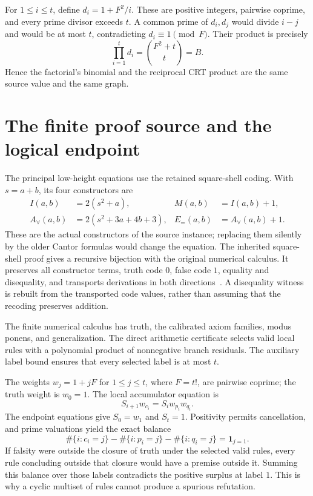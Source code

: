 \documentclass[11pt]{article}
\theoremstyle{remark}\newtheorem{remark}[theorem]{Remark}
\newcommand{\code}[1]{\texttt{\detokenize{#1}}}
\begin{document}
For $1\le i\le t$, define $d_i=1+F^2/i$. These are positive integers, pairwise coprime, and every prime divisor exceeds $t$. A common prime of $d_i,d_j$ would divide $i-j$ and would be at most $t$, contradicting $d_i\equiv1\pmod F$. Their product is precisely
\[
 \prod_{i=1}^t d_i=\binom{F^2+t}{t}=B.
\]
Hence the factorial's binomial and the reciprocal CRT product are the same source value and the same graph.

\section{The finite proof source and the logical endpoint}
\label{sec:logic}

The principal low-height equations use the retained \code{xx0} square-shell coding. With $s=a+b$, its four constructors are
\begin{align*}
 I(a,b)&=2(s^2+a),& M(a,b)&=I(a,b)+1,\\
 A_{\forall}(a,b)&=2(s^2+3a+4b+3),&E_{=}(a,b)&=A_{\forall}(a,b)+1.
\end{align*}
These are the actual constructors of the source instance; replacing them silently by the older Cantor formulas would change the equation. The inherited square-shell proof gives a recursive bijection with the original numerical calculus. It preserves all constructor terms, truth code $0$, false code $1$, equality and disequality, and transports derivations in both directions~\cite{shell}. A disequality witness is rebuilt from the transported code values, rather than assuming that the recoding preserves addition.

The finite numerical calculus has truth, the calibrated axiom families, modus ponens, and generalization. The direct arithmetic certificate selects valid local rules with a polynomial product of nonnegative branch residuals. The auxiliary label bound ensures that every selected label is at most $t$.

The weights $w_j=1+jF$ for $1\le j\le t$, where $F=t!$, are pairwise coprime; the truth weight is $w_0=1$. The local accumulator equation is
\[
 S_{i+1}w_{c_i}=S_iw_{p_i}w_{q_i}.
\]
The endpoint equations give $S_0=w_1$ and $S_t=1$. Positivity permits cancellation, and prime valuations yield the exact balance
\[
 \#\{i:c_i=j\}-\#\{i:p_i=j\}-\#\{i:q_i=j\}=\mathbf1_{j=1}.
\]
If falsity were outside the closure of truth under the selected valid rules, every rule concluding outside that closure would have a premise outside it. Summing this balance over those labels contradicts the positive surplus at label $1$. This is why a cyclic multiset of rules cannot produce a spurious refutation.
\end{document}
